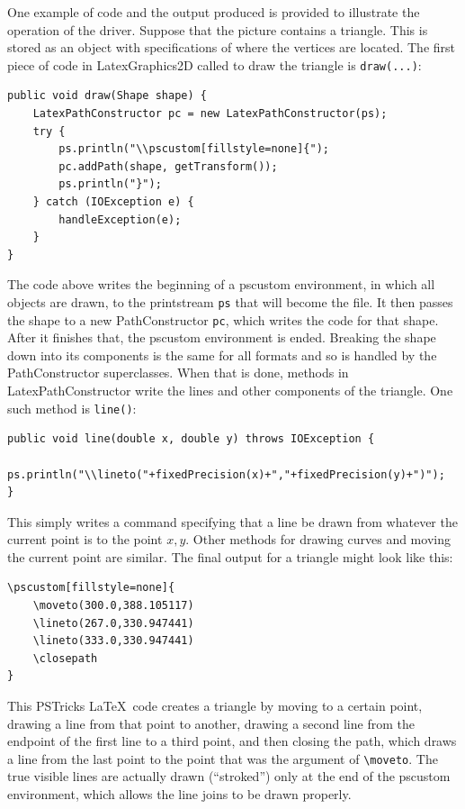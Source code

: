 \documentclass[11pt]{report}
\begin{document}
One example of code and the output produced is provided to illustrate the operation of the driver. Suppose that the picture contains a triangle. This is stored as an object with specifications of where the vertices are located. The first piece of code in LatexGraphics2D called to draw the triangle is \texttt{draw(...)}: \newpage
\setlength{\baselineskip}{13pt}
\begin{verbatim}
public void draw(Shape shape) {
    LatexPathConstructor pc = new LatexPathConstructor(ps);
    try {
        ps.println("\\pscustom[fillstyle=none]{");
        pc.addPath(shape, getTransform());
        ps.println("}");
    } catch (IOException e) {
        handleException(e);
    }
}
\end{verbatim}
\setlength{\baselineskip}{26pt} \vspace{-10pt}
The code above writes the beginning of a pscustom environment, in which all objects are drawn, to the printstream \texttt{ps} that will become the file. It then passes the shape to a new PathConstructor \texttt{pc}, which writes the code for that shape. After it finishes that, the pscustom environment is ended. Breaking the shape down into its components is the same for all formats and so is handled by the PathConstructor superclasses. When that is done, methods in LatexPathConstructor write the lines and other components of the triangle. One such method is \texttt{line()}:

\setlength{\baselineskip}{13pt}
\begin{verbatim}
public void line(double x, double y) throws IOException {
    ps.println("\\lineto("+fixedPrecision(x)+","+fixedPrecision(y)+")");
}
\end{verbatim}
\setlength{\baselineskip}{26pt} \vspace{-10pt}
This simply writes a command specifying that a line be drawn from whatever the current point is to the point $x,y$. Other methods for drawing curves and moving the current point are similar. The final output for a triangle might look like this:

\setlength{\baselineskip}{13pt}
\begin{verbatim}
\pscustom[fillstyle=none]{
    \moveto(300.0,388.105117)
    \lineto(267.0,330.947441)
    \lineto(333.0,330.947441)
    \closepath
}
\end{verbatim}
\setlength{\baselineskip}{26pt} \vspace{-10pt}
This PSTricks \LaTeX\ code creates a triangle by moving to a certain point, drawing a line from that point to another, drawing a second line from the endpoint of the first line to a third point, and then closing the path, which draws a line from the last point to the point that was the argument of \verb=\moveto=. The true visible lines are actually drawn (``stroked'') only at the end of the pscustom environment, which allows the line joins to be drawn properly.
\end{document}

